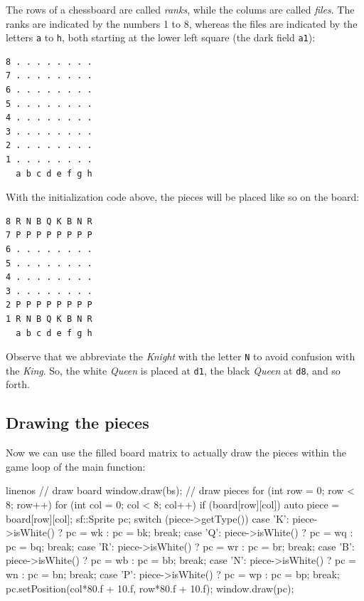 The rows of a chessboard are called \emph{ranks}, while the colums are called
\emph{files}.
The ranks are indicated by the numbers 1 to 8, whereas the files are indicated by the letters
\texttt{a} to \texttt{h}, both starting at the lower left square (the dark field \texttt{a1}):
\begin{samepage}
\begin{verbatim}
8 . . . . . . . .
7 . . . . . . . .
6 . . . . . . . .
5 . . . . . . . .
4 . . . . . . . .
3 . . . . . . . .
2 . . . . . . . .
1 . . . . . . . .
  a b c d e f g h
\end{verbatim}

With the initialization code above, the pieces will be placed like so on the board:

\begin{verbatim}
8 R N B Q K B N R
7 P P P P P P P P
6 . . . . . . . .
5 . . . . . . . .
4 . . . . . . . .
3 . . . . . . . .
2 P P P P P P P P
1 R N B Q K B N R
  a b c d e f g h
\end{verbatim}
\end{samepage}

Observe that we abbreviate the \emph{Knight} with the letter \texttt{N} to avoid confusion with
the \emph{King}.
So, the white \emph{Queen} is placed at \texttt{d1}, the black \emph{Queen} at \texttt{d8},
and so forth.

\subsection{Drawing the pieces}
Now we can use the filled board matrix to actually draw the pieces within the game loop of the
main function:

\begin{cpp*}{linenos}
    // draw board
    window.draw(bs);
    // draw pieces
    for (int row = 0; row < 8; row++) {
      for (int col = 0; col < 8; col++) {
        if (board[row][col]) {
          auto piece = board[row][col];
          sf::Sprite pc;
          switch (piece->getType()) {
          case 'K':
            piece->isWhite() ? pc = wk : pc = bk;
            break;
          case 'Q':
            piece->isWhite() ? pc = wq : pc = bq;
            break;
          case 'R':
            piece->isWhite() ? pc = wr : pc = br;
            break;
          case 'B':
            piece->isWhite() ? pc = wb : pc = bb;
            break;
          case 'N':
            piece->isWhite() ? pc = wn : pc = bn;
            break;
          case 'P':
            piece->isWhite() ? pc = wp : pc = bp;
            break;
          }
          pc.setPosition(col*80.f + 10.f, row*80.f + 10.f);
          window.draw(pc);
        }
      }
    }
\end{cpp*}


